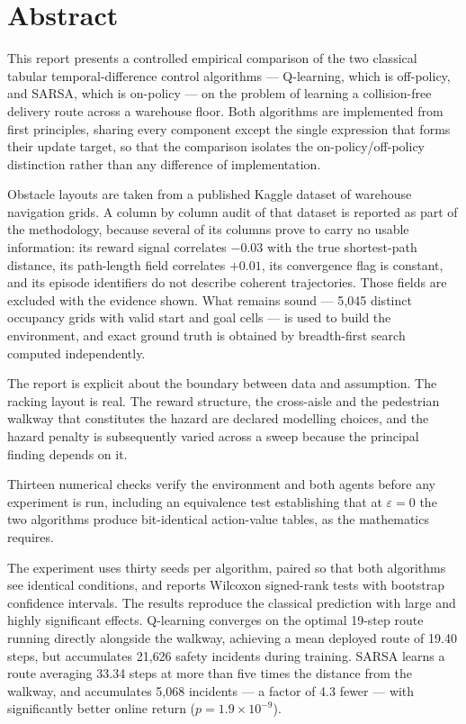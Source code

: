 \chapter*{Abstract}

This report presents a controlled empirical comparison of the two classical tabular
temporal-difference control algorithms --- Q-learning, which is off-policy, and SARSA, which is
on-policy --- on the problem of learning a collision-free delivery route across a warehouse floor.
Both algorithms are implemented from first principles, sharing every component except the single
expression that forms their update target, so that the comparison isolates the on-policy/off-policy
distinction rather than any difference of implementation.

Obstacle layouts are taken from a published Kaggle dataset of warehouse navigation grids. A column
by column audit of that dataset is reported as part of the methodology, because several of its
columns prove to carry no usable information: its reward signal correlates $-0.03$ with the true
shortest-path distance, its path-length field correlates $+0.01$, its convergence flag is constant,
and its episode identifiers do not describe coherent trajectories. Those fields are excluded with
the evidence shown. What remains sound --- 5{,}045 distinct occupancy grids with valid start and
goal cells --- is used to build the environment, and exact ground truth is obtained by
breadth-first search computed independently.

The report is explicit about the boundary between data and assumption. The racking layout is real.
The reward structure, the cross-aisle and the pedestrian walkway that constitutes the hazard are
declared modelling choices, and the hazard penalty is subsequently varied across a sweep because
the principal finding depends on it.

Thirteen numerical checks verify the environment and both agents before any experiment is run,
including an equivalence test establishing that at $\varepsilon = 0$ the two algorithms produce
bit-identical action-value tables, as the mathematics requires.

The experiment uses thirty seeds per algorithm, paired so that both algorithms see identical
conditions, and reports Wilcoxon signed-rank tests with bootstrap confidence intervals. The
results reproduce the classical prediction with large and highly significant effects. Q-learning
converges on the optimal 19-step route running directly alongside the walkway, achieving a mean
deployed route of 19.40 steps, but accumulates 21{,}626 safety incidents during training. SARSA
learns a route averaging 33.34 steps at more than five times the distance from the walkway, and
accumulates 5{,}068 incidents --- a factor of 4.3 fewer --- with significantly better online
return ($p = 1.9\times10^{-9}$).

